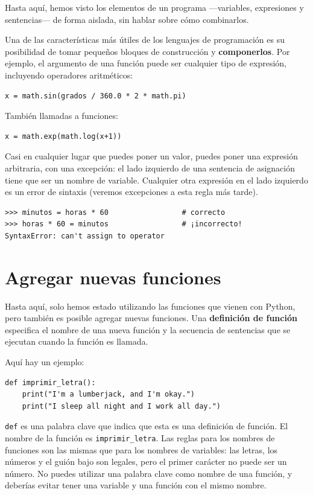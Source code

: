 \documentclass[10pt]{book}
\begin{document}
Hasta aquí, hemos visto los elementos de un programa ---variables,
expresiones y sentencias--- de forma aislada, sin hablar sobre cómo
combinarlos.

Una de las características más útiles de los lenguajes de programación es su
posibilidad de tomar pequeños bloques de construcción y {\bf componerlos}.  Por
ejemplo, el argumento de una función puede ser cualquier tipo de expresión,
incluyendo operadores aritméticos:

\begin{verbatim}
x = math.sin(grados / 360.0 * 2 * math.pi)
\end{verbatim}
%
También llamadas a funciones:

\begin{verbatim}
x = math.exp(math.log(x+1))
\end{verbatim}
%
Casi en cualquier lugar que puedes poner un valor, puedes poner una expresión
arbitraria, con una excepción: el lado izquierdo de una sentencia
de asignación tiene que ser un nombre de variable. Cualquier otra expresión en el lado
izquierdo es un error de sintaxis (veremos excepciones a esta regla
más tarde).

\begin{verbatim}
>>> minutos = horas * 60                 # correcto
>>> horas * 60 = minutos                 # ¡incorrecto!
SyntaxError: can't assign to operator
\end{verbatim}
%


\section{Agregar nuevas funciones}

Hasta aquí, solo hemos estado utilizando las funciones que vienen con Python,
pero también es posible agregar nuevas funciones.
Una {\bf definición de función} especifica el nombre de una nueva función y
la secuencia de sentencias que se ejecutan cuando la función es llamada.

Aquí hay un ejemplo:

\begin{verbatim}
def imprimir_letra():
    print("I'm a lumberjack, and I'm okay.")
    print("I sleep all night and I work all day.")
\end{verbatim}
%
{\tt def} es una palabra clave que indica que esta es una definición
de función. El nombre de la función es \verb"imprimir_letra".  Las
reglas para los nombres de funciones son las mismas que para los nombres de variables: las letras,
los números y el guión bajo son legales, pero el primer carácter
no puede ser un número.  No puedes utilizar una palabra clave como nombre de una función,
y deberías evitar tener una variable y una función con el mismo
nombre.
\end{document}
